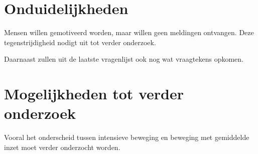 \section{Onduidelijkheden}

Mensen willen gemotiveerd worden, maar willen geen meldingen ontvangen. Deze tegenstrijdigheid nodigt uit tot verder onderzoek.

Daarnaast zullen uit de laatste vragenlijst ook nog wat vraagtekens opkomen.

\section{Mogelijkheden tot verder onderzoek}

Vooral het onderscheid tussen intensieve beweging en beweging met gemiddelde inzet moet verder onderzocht worden.
